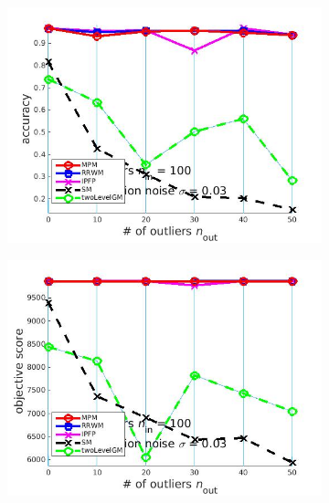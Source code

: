 \documentclass[
	fontsize=12pt,
	paper=a4,
	twoside=false,
	numbers=noenddot,
	plainheadsepline,
	toc=listof,
	toc=bibliography
]{scrartcl}
\begin{document}
\begin{figure}[h] 
	\begin{subfigure}[b]{0.3\textwidth}
		\centering
		\includegraphics[scale=0.25]{"fig_ver2608/syntheticPointSets/ver4.2.1/outliertest_n50/accuracy_avg10t"} 
	\end{subfigure}%
	\begin{subfigure}[b]{0.3\textwidth}
		\centering
		\includegraphics[scale=0.25]{"fig_ver2608/syntheticPointSets/ver4.2.1/outliertest_n50/score_avg10t"} 
	\end{subfigure} 
	\begin{subfigure}[b]{0.3\textwidth}
		\centering

\end{subfigure}
\end{figure}
\end{document}
